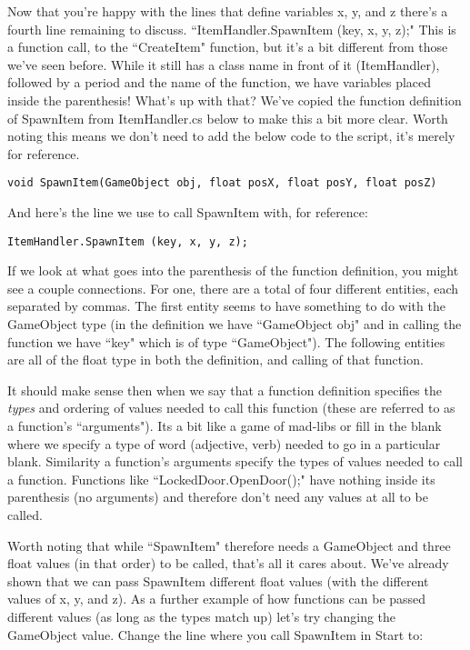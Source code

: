 \documentclass{article}
\begin{document}
Now that you're happy with the lines that define variables x, y, and z there's a fourth line remaining to discuss. ``ItemHandler.SpawnItem (key, x, y, z);" This is a function call, to the ``CreateItem" function, but it's a bit different from those we've seen before. While it still has a class name in front of it (ItemHandler), followed by a period and the name of the function, we have variables placed inside the parenthesis! What's up with that? We've copied the function definition of SpawnItem from ItemHandler.cs below to make this a bit more clear. Worth noting this means we don't need to add the below code to the script, it's merely for reference. 

\lstset{style=sharpc}
\begin{lstlisting}
void SpawnItem(GameObject obj, float posX, float posY, float posZ)
\end{lstlisting}

And here's the line we use to call SpawnItem with, for reference: 

\lstset{style=sharpc}
\begin{lstlisting}
ItemHandler.SpawnItem (key, x, y, z);
\end{lstlisting}

If we look at what goes into the parenthesis of the function definition, you might see a couple connections. For one, there are a total of four different entities, each separated by commas. The first entity seems to have something to do with the GameObject type (in the definition we have ``GameObject obj" and in calling the function we have ``key" which is of type ``GameObject"). The following entities are all of the float type in both the definition, and calling of that function.

It should make sense then when we say that a function definition specifies the \textit{types} and ordering of values needed to call this function (these are referred to as a function's ``arguments"). Its a bit like a game of mad-libs or fill in the blank where we specify a type of word (adjective, verb) needed to go in a particular blank. Similarity a function's arguments specify the types of values needed to call a function. Functions like ``LockedDoor.OpenDoor();" have nothing inside its parenthesis (no arguments) and therefore don't need any values at all to be called. 

Worth noting that while ``SpawnItem" therefore needs a GameObject and three float values (in that order) to be called, that's all it cares about. We've already shown that we can pass SpawnItem different float values (with the different values of x, y, and z). As a further example of how functions can be passed different values (as long as the types match up) let's try changing the GameObject value. Change the line where you call SpawnItem in Start to: 
\end{document}
